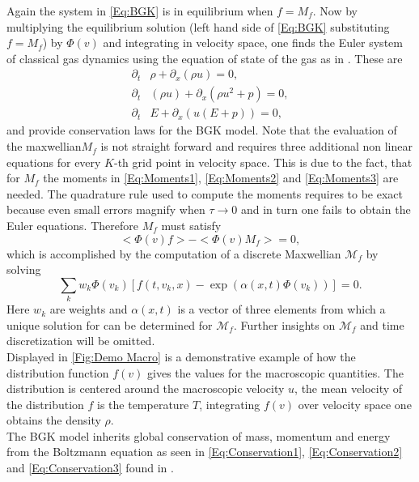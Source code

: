 Again the system in \cref{Eq:BGK} is in equilibrium when \(f = M_f\). Now by multiplying the equilibrium solution (left hand side of \cref{Eq:BGK} substituting \(f=M_f\)) by \(\Phi(v)\) and integrating in velocity space, one finds the Euler system of classical gas dynamics using the equation of state of the gas as in \cite{puppo2019kinetic}. These are
\begin{align}
	\partial_t&\rho + \partial_x(\rho u) = 0 \mathrm{,}\label{Eq:Conservation1} \\
	\partial_t&(\rho u) + \partial_x(\rho u^2 + p) = 0\mathrm{,}\label{Eq:Conservation2}\\
	\partial_t&E + \partial_x(u(E+p)) = 0\label{Eq:Conservation3}\mathrm{,}
\end{align}
and provide conservation laws for the BGK model. Note that the evaluation of the maxwellian\(M_f\) is not straight forward and requires three additional non linear equations for every \(K\)-th grid point in velocity space. This is due to the fact, that for \(M_f\) the moments in \cref{Eq:Moments1}, \cref{Eq:Moments2} and \cref{Eq:Moments3} are needed. The quadrature rule used to compute the moments requires to be exact because even small errors magnify when \(\tau \rightarrow 0\) and in turn one fails to obtain the Euler equations. Therefore \(M_f\) must satisfy  
\begin{equation}
	<\Phi(v)f> - <\Phi(v)M_f> = 0\mathrm{,}
\end{equation}
which is accomplished by the computation of a discrete Maxwellian \(\mathcal{M}_f\) by solving
\begin{equation}
	\sum_k w_k \Phi(v_k) [f(t,v_k,x) - \exp(\alpha(x,t)\Phi(v_k))] = 0\mathrm{.}
\end{equation}
Here \(w_k\) are weights and \(\alpha(x,t)\) is a vector of three elements from which a unique solution for can be determined for \(\mathcal{M}_f\). Further insights on \(\mathcal{M}_f\) and time discretization will be omitted.\\

Displayed in \cref{Fig:Demo Macro} is a demonstrative example of how the distribution function \(f(v)\) gives the values for the macroscopic quantities. The distribution is centered around the macroscopic velocity \(u\), the mean velocity of the distribution \(f\) is the temperature \(T\), integrating \(f(v)\) over velocity space one obtains the density \(\rho\).\\ 

The BGK model inherits global conservation of mass, momentum and energy from the Boltzmann equation as seen in \cref{Eq:Conservation1}, \cref{Eq:Conservation2} and \cref{Eq:Conservation3} found in \cite{puppo2019kinetic}.
